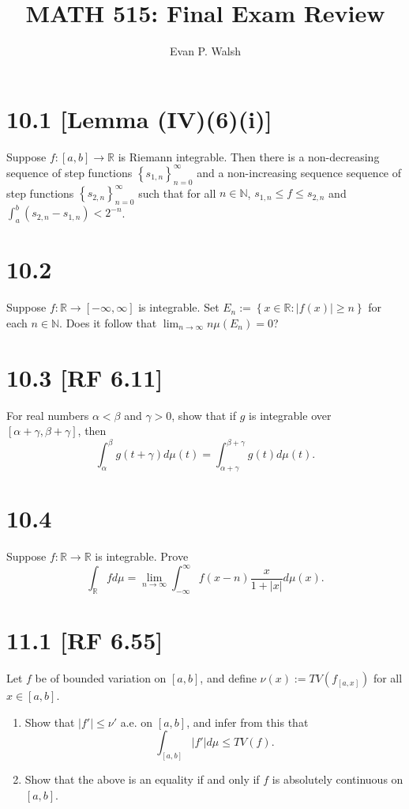 \documentclass[12pt]{article}
\title{MATH 515: Final Exam Review}
\author{Evan P. Walsh}
\begin{document}


\section*{10.1 [Lemma (IV)(6)(i)]}
Suppose $f : [a,b] \rightarrow \mathbb{R}$ is Riemann integrable. Then there is a non-decreasing sequence of step functions $\left\{ s_{1,n}
\right\}_{n=0}^{\infty}$ and a non-increasing sequence sequence of step functions $\left\{ s_{2,n} \right\}_{n=0}^{\infty}$ such that for all $n \in
\mathbb{N}$, $s_{1,n} \leq f \leq s_{2,n}$ and $\int_{a}^{b}(s_{2,n} - s_{1,n}) < 2^{-n}$.



\section*{10.2}
Suppose $f: \mathbb{R} \rightarrow [-\infty, \infty]$ is integrable. Set $E_{n} := \left\{ x \in \mathbb{R} : |f(x)| \geq n \right\}$ for each $n \in
\mathbb{N}$. Does it follow that $\lim_{n\rightarrow\infty}n\mu(E_{n}) = 0$?




\section*{10.3 [RF 6.11]}
For real numbers $\alpha < \beta$ and $\gamma > 0$, show that if $g$ is integrable over $[\alpha + \gamma, \beta + \gamma]$, then 
\[ \int_{\alpha}^{\beta}g(t + \gamma)d\mu(t) = \int_{\alpha + \gamma}^{\beta + \gamma}g(t)d\mu(t). \]



\section*{10.4}
Suppose $f : \mathbb{R} \rightarrow \mathbb{R}$ is integrable. Prove 
\[ \int_{\mathbb{R}}fd\mu = \lim_{n\rightarrow\infty}\int_{-\infty}^{\infty}f(x-n)\frac{x}{1 + |x|}d\mu(x). \]



\section*{11.1 [RF 6.55]}
Let $f$ be of bounded variation on $[a,b]$, and define $\nu(x) := TV(f_{[a,x]})$ for all $x \in [a,b]$.
\begin{enumerate}[label=(\roman*)]
\item Show that $|f'| \leq \nu'$ a.e. on $[a,b]$, and infer from this that 
\[ \int_{[a,b]}|f'|d\mu \leq TV(f). \]
\item Show that the above is an equality if and only if $f$ is absolutely continuous on $[a,b]$.
\end{enumerate}
\end{document}
